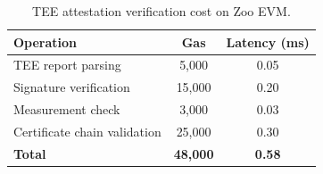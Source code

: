 \begin{table}[t]
\centering
\begin{tabular}{lcc}
\toprule
\textbf{Operation} & \textbf{Gas} & \textbf{Latency (ms)} \\
\midrule
TEE report parsing & 5,000 & 0.05 \\
Signature verification & 15,000 & 0.20 \\
Measurement check & 3,000 & 0.03 \\
Certificate chain validation & 25,000 & 0.30 \\
\midrule
\textbf{Total} & \textbf{48,000} & \textbf{0.58} \\
\bottomrule
\end{tabular}
\caption{TEE attestation verification cost on Zoo EVM.}
\label{tab:attest-cost}
\end{table}

